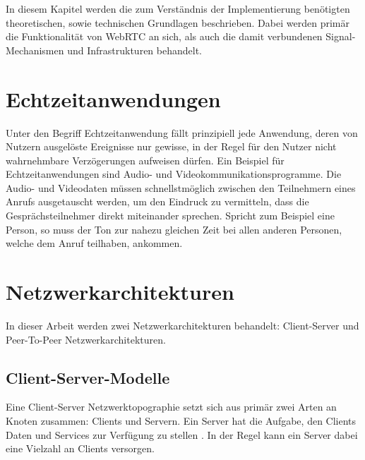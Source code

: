 In diesem Kapitel werden die zum Verständnis der Implementierung benötigten theoretischen, sowie technischen Grundlagen beschrieben. Dabei werden primär die Funktionalität von \acs{WebRTC} an sich, als auch die damit verbundenen Signal-Mechanismen und Infrastrukturen behandelt.

\section{Echtzeitanwendungen}
Unter den Begriff Echtzeitanwendung fällt prinzipiell jede Anwendung, deren von Nutzern ausgelöste Ereignisse nur gewisse, in der Regel für den Nutzer nicht wahrnehmbare Verzögerungen aufweisen dürfen. Ein Beispiel für Echtzeitanwendungen sind Audio- und Videokommunikationsprogramme. Die Audio- und Videodaten müssen schnellstmöglich zwischen den Teilnehmern eines Anrufs ausgetauscht werden, um den Eindruck zu vermitteln, dass die Gesprächsteilnehmer direkt miteinander sprechen. Spricht zum Beispiel eine Person, so muss der Ton zur nahezu gleichen Zeit bei allen anderen Personen, welche dem Anruf teilhaben, ankommen.

\section{Netzwerkarchitekturen}
In dieser Arbeit werden zwei Netzwerkarchitekturen behandelt: Client-Server und Peer-To-Peer Netzwerkarchitekturen.

\subsection{Client-Server-Modelle}
Eine Client-Server Netzwerktopographie setzt sich aus primär zwei Arten an Knoten zusammen: Clients und Servern. Ein Server hat die Aufgabe, den Clients Daten und Services zur Verfügung zu stellen \cite{silveira2015}. In der Regel kann ein Server dabei eine Vielzahl an Clients versorgen.\par



